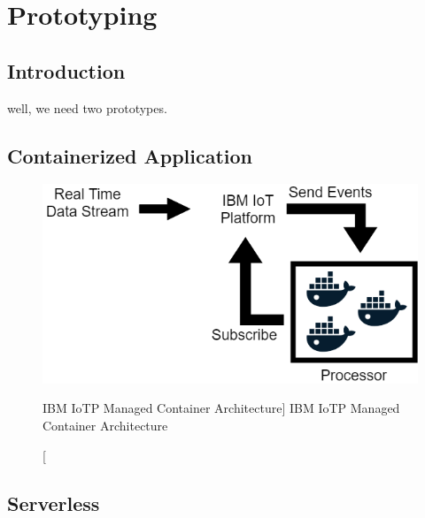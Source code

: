 \chapter{Prototyping}\label{chp:prototyping}


\section{Introduction}

well, we need two prototypes.

\section{Containerized Application}

\begin{figure}[ht]
    \includegraphics[width=0.6\linewidth]{images/streaming/containerArch.png}\centering
    \caption
    [IBM IoTP Managed Container Architecture]
    {IBM IoTP Managed Container Architecture}
    \label{fig:iotpManagedContainer}
\end{figure}


\section{Serverless}

